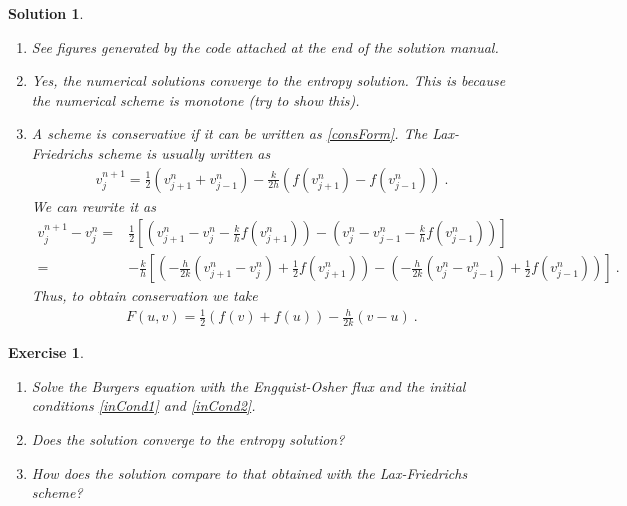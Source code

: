 \documentclass[10pt,letterpaper]{article}
\newcommand{\frb}[1]{ \left(  {#1} \right) }
\theoremstyle{break}
\newtheorem{exercise}{Exercise}
\newtheorem{solution}{Solution}
\begin{document}
\begin{solution}
	\begin{enumerate}
		\item
		See figures generated by the code
		attached at the end of the solution manual.
		
		\item[(b),(c)]
		\addtocounter{enumii}{2}
		Yes, the numerical solutions converge to the entropy solution. This is because the numerical scheme is monotone (try to show this).
		
		
		
		\item
		A scheme is conservative if it can be written as \eqref{consForm}.
		The Lax-Friedrichs scheme is usually written as 
		\begin{gather}
			v_{j}^{n+1}=\frac{1}{2}\left(v_{j+1}^{n}+v_{j-1}^{n}\right)
				-\frac{k}{2h}\left(f\frb{v_{j+1}^{n}}-f\frb{v_{j-1}^{n}}\right)\ .
		\end{gather}
		We can rewrite it as 
		\begin{align}
			v_{j}^{n+1}-v_{j}^{n}= & \frac{1}{2}\left[\left(v_{j+1}^{n}-v_{j}^{n}-\frac{k}{h}f\frb{v_{j+1}^{n}}\right)
					-\left(v_{j}^{n}-v_{j-1}^{n}-\frac{k}{h}f\frb{v_{j-1}^{n}}\right)\right]\\[0.5em]
				= & -\frac{k}{h}\left[ \left( -\frac{h}{2k}\left(v_{j+1}^{n}-v_{j}^{n}\right)
						+\frac{1}{2}f\frb{v_{j+1}^{n}}\right)
					-\left(-\frac{h}{2k}\left(v_{j}^{n}-v_{j-1}^{n}\right)
						+\frac{1}{2}f\frb{v_{j-1}^{n}}\right)\right]\ .
		\end{align}
		Thus, to obtain conservation we take
		\begin{gather}
			F\frb{u,v}= \frac{1}{2}\left(f(v)+f(u)\right) -\frac{h}{2k}\left(v-u\right)\ .
		\end{gather}
	\end{enumerate}
\end{solution}



















\begin{exercise}
	\begin{enumerate}
		\item
		Solve the Burgers equation with the Engquist-Osher flux and the initial conditions \eqref{inCond1} and \eqref{inCond2}.

		\item
		Does the solution converge to the entropy solution?

		\item
		How does the solution compare to that obtained with the Lax-Friedrichs scheme?

	\end{enumerate}
\end{exercise}
\end{document}
